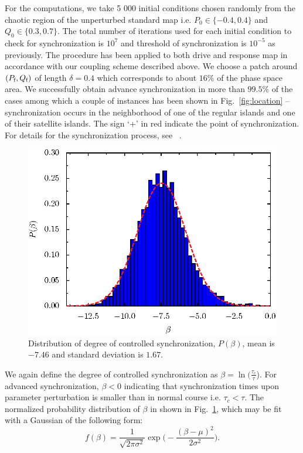 \documentclass[reprint,amsmath,amssymb,aps,pre]{revtex4-1}
\begin{document}
For the computations, we take 5 000 initial conditions chosen randomly from 
the chaotic region of the unperturbed standard map i.e. $P_0 \in \{-0.4,0.4\}$ 
and $Q_0 \in \{0.3,0.7\}$. The total number of iterations used for each 
initial condition to check for synchronization is $10^7$ and threshold of 
synchronization is $10^{-5}$ as previously.  The procedure has 
been applied to both drive and 
response map in accordance with our coupling  scheme described above. We 
choose a patch around $(P_\textnormal{f},Q_\textnormal{f})$  of length 
$\delta= 0.4$ which corresponds 
to about $16\%$ of the phase space area. We successfully obtain advance 
synchronization in more than $99.5\%$ of the cases among which a  couple of 
instances  has been shown in Fig.~\ref{fig:location} -- synchronization occurs 
in the neighborhood of one of the regular islands and one of their satellite 
islands.  The sign `+' in red indicate the point of synchronization. For 
details for the synchronization process, see ~\cite{Mahata2016,Das2017}.
\begin{figure}[h]
    \includegraphics[scale=0.8]{sync_time_beta.eps}
    \caption{\label{fig:beta_dist}\footnotesize Distribution of degree of 
        controlled synchronization, $P(\beta)$, mean is $-7.46$ and standard 
        deviation is $1.67$.}
\end{figure}
We again define the degree of controlled synchronization as $\beta = \ln 
(\frac{\tau_c}{\tau}$). For advanced synchronization, $\beta < 0$ indicating 
that synchronization times upon parameter perturbation is smaller than in 
normal course i.e. $\tau_c < \tau$. The normalized probability distribution of 
$\beta$ in shown in Fig.~\ref{fig:beta_dist}, which may be fit with a Gaussian 
of the following form:
\begin{equation}
f(\beta) =  
\frac{1}{\sqrt{2\pi\sigma^2}}\exp\Big(-\frac{(\beta-\mu)^2}{2\sigma^2}\Big).
\end{equation}
\end{document}
